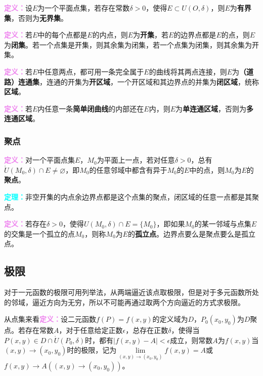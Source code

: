 \documentclass[UTF8, 12pt]{ctexart}
\begin{document}
        \textcolor{violet}{\textbf{定义：}}设$E$为一个平面点集，若存在常数$\delta>0$，使得$E\subset U(O,\delta)$，则$E$为\textbf{有界集}，否则为\textbf{无界集}。

        \textcolor{violet}{\textbf{定义：}}若$E$中的每个点都是$E$的内点，则$E$为\textbf{开集}，若$E$的边界点都是$E$的点，则$E$为\textbf{闭集}。若一个点集是开集，则其余集为闭集，若一个点集为闭集，则其余集为开集。

        \textcolor{violet}{\textbf{定义：}}若$E$中任意两点，都可用一条完全属于$E$的曲线将其两点连接，则$E$为\textbf{（道路）连通集}，连通的开集为\textbf{开区域}，一个开区域和其边界点的并集为\textbf{闭区域}，统称\textbf{区域}。

        \textcolor{violet}{\textbf{定义：}}若$E$内任意一条\textbf{简单闭曲线}的内部还在$E$内，则$E$为\textbf{单连通区域}，否则为\textbf{多连通区域}。

        \subsubsection{聚点}

        \textcolor{violet}{\textbf{定义：}}对一个平面点集$E$，$M_0$为平面上一点，若对任意$\delta>0$，总有$\mathring{U}(M_0,\delta)\cap E\neq\varnothing$，即$M_0$的任意邻域中都含有异于$M_0$的$E$中的点，则$M_0$为$E$的\textbf{聚点}。

        \textcolor{aqua}{\textbf{定理：}}非空开集的内点余边界点都是这个点集的聚点，闭区域的任意一点都是其聚点。

        \textcolor{violet}{\textbf{定义：}}若存在$\delta>0$，使得$U(M_0,\delta)\cap E=\{M_0\}$，即如果$M_0$的某一邻域与点集$E$的交集是一个孤立的点$M_0$，则称$M_0$为$E$的\textbf{孤立点}。边界点要么是聚点要么是孤立点。

        \subsection{极限}

        对于一元函数的极限可用列举法，从两端逼近该点取极限，但是对于多元函数所处的邻域，逼近方向为无穷，所以不可能再通过取两个方向逼近的方式求极限。

        从点集来看\textcolor{violet}{\textbf{定义：}}设二元函数$f(P)=f(x,y)$的定义域为$D$，$P_0(x_0,y_0)$为$D$聚点。若存在常数$A$，对于任意给定正数$\epsilon$，总存在正数$\delta$，使得当$P(x,y)\in D\cap\mathring{U}(P_0,\delta)$时，都有$\vert f(x,y)-A\vert<\epsilon$成立，则常数$A$为$f(x,y)$当$(x,y)\rightarrow(x_0,y_0)$时的极限，记为$\lim\limits_{(x,y)\to(x_0,y_0)}f(x,y)=A$或$f(x,y)\to A((x,y)\to(x_0,y_0))$。
\end{document}
